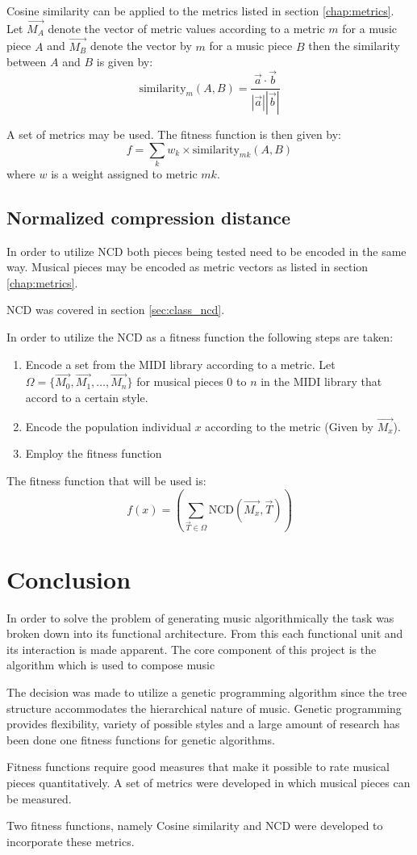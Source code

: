 Cosine similarity can be applied to the metrics listed in section \ref{chap:metrics}. Let $\vec{M_A}$ denote the vector of metric values according to a metric $m$ for a music piece $A$ and $\vec{M_B}$ denote the vector by $m$ for a music piece $B$ then the similarity between $A$ and $B$ is given by:
\[\text{similarity}_m(A,B) = \frac{\vec{a} \cdot \vec{b}}{|\vec{a}| |\vec{b}|}\]

A set of metrics may be used. 
The fitness function is then given by:
\[f = \sum_{k} w_k \times \text{similarity}_{mk}(A,B) \]
where $w$ is a weight assigned to metric $mk$.

\section{Normalized compression distance}
In order to utilize \ac{NCD} both pieces being tested need to be encoded in the same way. Musical pieces may be encoded as metric vectors as listed in section \ref{chap:metrics}.

\ac{NCD} was covered in section \ref{sec:class_ncd}.

In order to utilize the \ac{NCD} as a fitness function the following steps are taken:
\begin{enumerate}
\item Encode a set from the \ac{MIDI} library according to a metric. Let $\Omega = \{\vec{M_0}, \vec{M_1}, \ldots, \vec{M_n}\}$ for musical pieces $0$ to $n$ in the \ac{MIDI} library that accord to a certain style.
\item Encode the population individual $x$ according to the metric (Given by $\vec{M_x}$).
\item Employ the fitness function
\end{enumerate}

The fitness function that will be used is:
\[f(x) =  \left(\sum_{\vec{T}\in\Omega} \text{NCD}(\vec{M_x}, \vec{T}) \right)\]

\chapter{Conclusion}
In order to solve the problem of generating music algorithmically the task was broken down into its functional architecture. From this each functional unit and its interaction is made apparent. The core component of this project is the algorithm which is used to compose music

The decision was made to utilize a genetic programming algorithm since the tree structure accommodates the hierarchical nature of music. Genetic programming provides flexibility, variety of possible styles and a large amount of research has been done one fitness functions for genetic algorithms.

Fitness functions require good measures that make it possible to rate musical pieces quantitatively. A set of metrics were developed in which musical pieces can be measured.

Two fitness functions, namely Cosine similarity and \ac{NCD} were developed to incorporate these metrics.